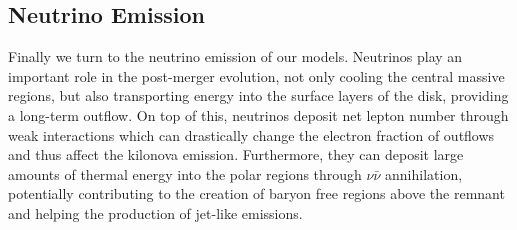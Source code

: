 


\subsection{Neutrino Emission}
%
Finally we turn to the neutrino emission of our models. Neutrinos play an important role in the post-merger evolution, not only cooling the central massive regions, but also transporting energy into the surface layers of the disk, providing a long-term outflow. On top of this, neutrinos deposit net lepton number through weak interactions which can drastically change the electron fraction of outflows and thus affect the kilonova emission. Furthermore, they can %
deposit large amounts of thermal energy into the polar regions 
through $\nu\bar\nu$ annihilation, potentially 
contributing to the creation of baryon free regions above the remnant and helping the production of jet-like emissions.


